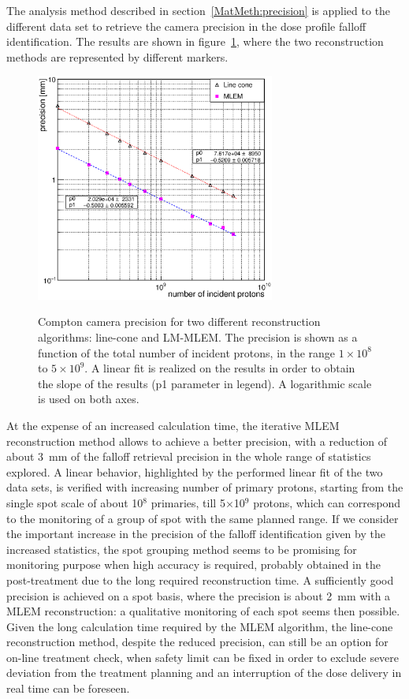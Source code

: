 The analysis method described in section~\ref{MatMeth:precision} is applied to the different data set to retrieve the camera precision in the  dose profile falloff identification. The results are shown in figure~\ref{fig:precision}, where the two reconstruction methods are represented by different markers. \\

\begin{figure}[!hbtp]	
\centering
\caption{Compton camera precision for two different reconstruction algorithms: line-cone and LM-MLEM. The precision is shown as a function of the total number of incident protons, in the range $1\times10^{8}$ to $5\times10^{9}$. A linear fit is realized on the results in order to obtain the slope of the results (p1 parameter in legend). A logarithmic scale is used on both axes. }	
\includegraphics[width=0.7\textwidth]{./Figure/2017-10-21_Precision_Comparaison_linecone_MLEM_Article_Fit.eps}
\label{fig:precision}
\end{figure}

At the expense of an increased calculation time, the iterative MLEM reconstruction method allows to achieve a better precision, with a reduction of about 3~mm of the falloff retrieval precision in the whole range of statistics explored. A linear behavior, highlighted by the performed linear fit of the two data sets, is verified with increasing number of primary protons, starting from the single spot scale of about 10$^8$ primaries, till 5$\times$10$^9$ protons, which can correspond to the monitoring of a group of spot with the same planned range. If we consider the important increase in the precision of the falloff identification given by the increased statistics, the spot grouping method seems to be promising for monitoring purpose when high accuracy is required, probably obtained in the post-treatment due to the long required reconstruction time. A sufficiently good precision is achieved on a spot basis, where the precision is about 2~mm with a MLEM reconstruction: a qualitative monitoring of each spot seems then possible. Given the long calculation time required by the MLEM algorithm, the line-cone reconstruction method, despite the reduced precision, can still be an option for on-line treatment check, when safety limit can be fixed in order to exclude severe deviation from the treatment planning and an interruption of the dose delivery in real time can be foreseen.          


